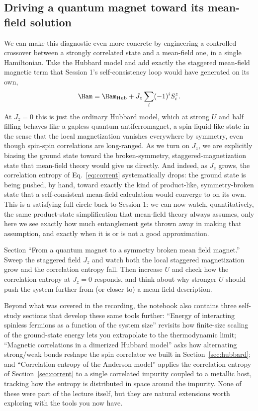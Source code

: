 \documentclass[all_sessions.tex]{subfiles}
\begin{document}
\subsection{Driving a quantum magnet toward its mean-field solution}
We can make this diagnostic even more concrete by engineering a controlled crossover between a
strongly correlated state and a mean-field one, in a single Hamiltonian. Take the Hubbard model and
add exactly the staggered mean-field magnetic term that Session 1's self-consistency loop would have
generated on its own,
\begin{equation}
  \Ham = \Ham_{\mathrm{Hub}} + J_z\sum_i (-1)^i S_i^z.
\end{equation}
At $J_z=0$ this is just the ordinary Hubbard model, which at strong $U$ and half filling behaves like
a gapless quantum antiferromagnet, a spin-liquid-like state in the sense that the local magnetization
vanishes everywhere by symmetry, even though spin-spin correlations are long-ranged. As we turn on
$J_z$, we are explicitly biasing the ground state toward the broken-symmetry, staggered-magnetization
state that mean-field theory would give us directly. And indeed, as $J_z$ grows, the correlation
entropy of Eq.~\eqref{eq:corrent} systematically drops: the ground state is being pushed, by hand,
toward exactly the kind of product-like, symmetry-broken state that a self-consistent mean-field
calculation would converge to on its own. This is a satisfying full circle back to Session 1: we can
now watch, quantitatively, the same product-state simplification that mean-field theory always
assumes, only here we see exactly how much entanglement gets thrown away in making that assumption,
and exactly when it is or is not a good approximation.

\begin{notebook}
Section ``From a quantum magnet to a symmetry broken mean field magnet.'' Sweep the staggered field
$J_z$ and watch both the local staggered magnetization grow and the correlation entropy fall.
Then increase $U$ and check how the correlation entropy at $J_z=0$ responds, and think about why
stronger $U$ should push the system further from (or closer to) a mean-field description.
\end{notebook}

\begin{notebook}
Beyond what was covered in the recording, the notebook also contains three self-study sections
that develop these same tools further: ``Energy of interacting spinless fermions as a function of
the system size'' revisits how finite-size scaling of the ground-state energy lets you extrapolate
to the thermodynamic limit; ``Magnetic correlations in a dimerized Hubbard model'' asks how
alternating strong/weak bonds reshape the spin correlator we built in
Section~\ref{sec:hubbard}; and ``Correlation entropy of the Anderson model'' applies the correlation
entropy of Section~\ref{sec:corrent} to a single correlated impurity coupled to a metallic host,
tracking how the entropy is distributed in space around the impurity. None of these were part of the
lecture itself, but they are natural extensions worth exploring with the tools you now have.
\end{notebook}
\end{document}
